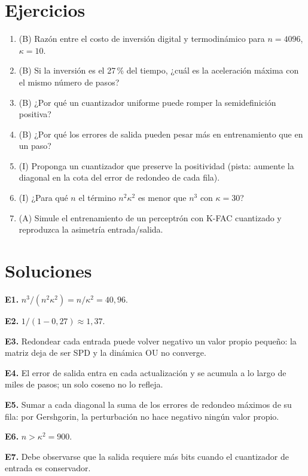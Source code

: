 \documentclass[11pt,a4paper]{article}
\begin{document}
\section{Ejercicios}
\begin{enumerate}[label=\textbf{E\arabic*.}]
\item (B) Razón entre el costo de inversión digital y termodinámico para $n=4096$, $\kappa=10$.
\item (B) Si la inversión es el 27\,\% del tiempo, ¿cuál es la aceleración máxima con el mismo número de pasos?
\item (B) ¿Por qué un cuantizador uniforme puede romper la semidefinición positiva?
\item (B) ¿Por qué los errores de salida pueden pesar más en entrenamiento que en un paso?
\item (I) Proponga un cuantizador que preserve la positividad (pista: aumente la diagonal en la cota del error de redondeo de cada fila).
\item (I) ¿Para qué $n$ el término $n^2\kappa^2$ es menor que $n^3$ con $\kappa=30$?
\item (A) Simule el entrenamiento de un perceptrón con K-FAC cuantizado y reproduzca la asimetría entrada/salida.
\end{enumerate}
\section{Soluciones}
\begin{solucion}
\textbf{E1.} $n^3/(n^2\kappa^2)=n/\kappa^2=40{,}96$.

\textbf{E2.} $1/(1-0{,}27)\approx1{,}37$.

\textbf{E3.} Redondear cada entrada puede volver negativo un valor propio pequeño: la matriz deja de ser SPD y la dinámica OU no converge.

\textbf{E4.} El error de salida entra en cada actualización y se acumula a lo largo de miles de pasos; un solo coseno no lo refleja.

\textbf{E5.} Sumar a cada diagonal la suma de los errores de redondeo máximos de su fila: por Gershgorin, la perturbación no hace negativo ningún valor propio.

\textbf{E6.} $n>\kappa^2=900$.

\textbf{E7.} Debe observarse que la salida requiere más bits cuando el cuantizador de entrada es conservador.
\end{solucion}
\end{document}
